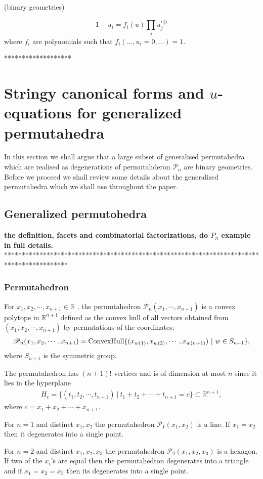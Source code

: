 \documentclass[hidelinks,12pt]{article}
\newcommand{\bea}[1]{\begin{eqnarray}\label{#1} }
\newcommand{\eea}{\end{eqnarray}}
\def\bea{\begin{eqnarray}}
\def\eea{\end{eqnarray}}
\begin{document}
(binary geometries)

\[
	1-u_i=f_i(u)\prod_{j}u_j^{i||j}
\]
where $f_i$ are polynomials such that $f_i(\dots,u_i=0,\dots)=1$.


*******************

\newpage
\section{Stringy canonical forms and $u$-equations for generalized permutahedra}
In this section we shall argue that  a large subset of generalised permutahedra which are realised as degenerations of permutahderon ${\mathscr P_n}$ are binary geometries. Before we proceed we shall review some details about the generalised permutahedra which we shall use throughout the paper.
\subsection{Generalized permutohedra} {\bf the definition, facets and combinatorial factorizations, do $P_n$ example in full details.}
******************************************************************************************
\subsubsection*{Permutahedron}
 For $x_1,x_2, \cdots, x_{n+1} \in \mathbb{R} $ , the permutahedron ${\mathscr P_n}(x_1,\cdots,x_{n+1})$ is a convex polytope in $\mathbb{R}^{n+1}$ defined as the convex hull of all vectors obtained from $(x_1,x_2, \cdots, x_{n+1})$ by permutations of the coordinates:
 \bea
{\mathscr P_n}(x_1,x_2, \cdots, x_{n+1}) = {\rm ConvexHull} \{ (x_{w(1)},x_{w(2)}, \cdots, x_{w(n+1)})~ |~ w \in S_{n+1} \}, \nonumber
 \eea
 where $S_{n+1}$ is the symmetric group. 
 
 The permutahedron has $(n+1)!$ vertices and is of dimension at most $n$ since it lies in the hyperplane 
 \bea
 H_c= \{(t_1,t_2, \cdots, t_{n+1}) ~|~ t_1 + t_2 + \cdots + t_{n+1}= c \} \subset \mathbb{R}^{n+1}, \nonumber
 \eea
where $c= x_1+x_2+ \cdots +x_{n+1}$.

For $n=1$ and distinct $x_1,x_2$ the permutahedron ${\mathscr P_1}(x_1,x_2)$ is a line. If  $x_1=x_2$ then it degenerates into a single point.

For $n=2$ and distinct $x_1,x_2, x_3$ the permutahedron ${\mathscr P_2}(x_1,x_2, x_3)$ is a hexagon. If two of the $x_i$'s are equal then the permutahedron degenerates into a triangle and if $x_1= x_2 = x_3$ then its degenerates into a single point.
\end{document}
